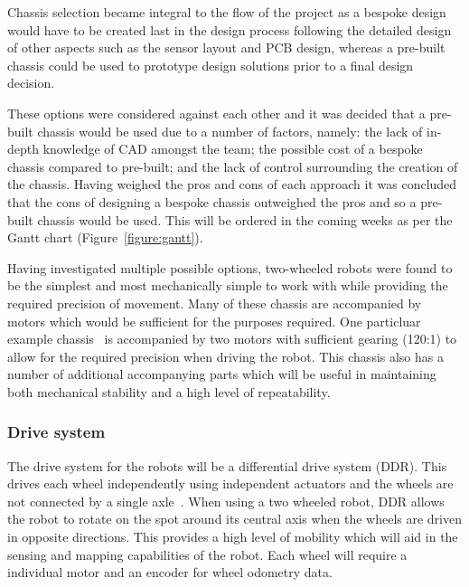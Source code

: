 Chassis selection became integral to the flow of the project as a
bespoke design would have to be created last in the design process
following the detailed design of other aspects such as the sensor layout
and PCB design, whereas a pre-built chassis could be used to prototype
design solutions prior to a final design decision.

These options were considered against each other and it was decided
that a pre-built chassis would be used due to a number of factors, namely:
the lack of in-depth knowledge of CAD amongst the team; the possible cost
of a bespoke chassis compared to pre-built; and the lack of control
surrounding the creation of the chassis. Having weighed the pros and cons
of each approach it was concluded that the cons of designing a bespoke
chassis outweighed the pros and so a pre-built chassis would be used. This
will be ordered in the coming weeks as per the Gantt chart (Figure~\ref{figure:gantt}).

Having investigated multiple possible options, two-wheeled robots were
found to be the simplest and most mechanically simple to work with while
providing the required precision of movement. Many of these chassis are
accompanied by motors which would be sufficient for the purposes required.
One particluar example chassis~\cite{pololuchassis} is  accompanied by two
motors with sufficient gearing (120:1) to allow for the required precision
when driving the robot. This chassis also has a number of additional
accompanying parts which will be useful in maintaining both mechanical
stability and a high level of repeatability.


\subsubsection{Drive system}\label{design/mechanical/drive}

The drive system for the robots will be a differential drive system (DDR).
This drives each wheel independently using independent actuators and the
wheels are not connected by a single axle~\cite[p.~146]{braunl_embedded_2013}.
When using a two wheeled robot, DDR allows the
robot to rotate on the spot around its central axis when the wheels are
driven in opposite directions. This provides a high level of mobility which
will aid in the sensing and mapping capabilities of the robot. Each wheel
will require a individual motor and an encoder for wheel odometry data.

